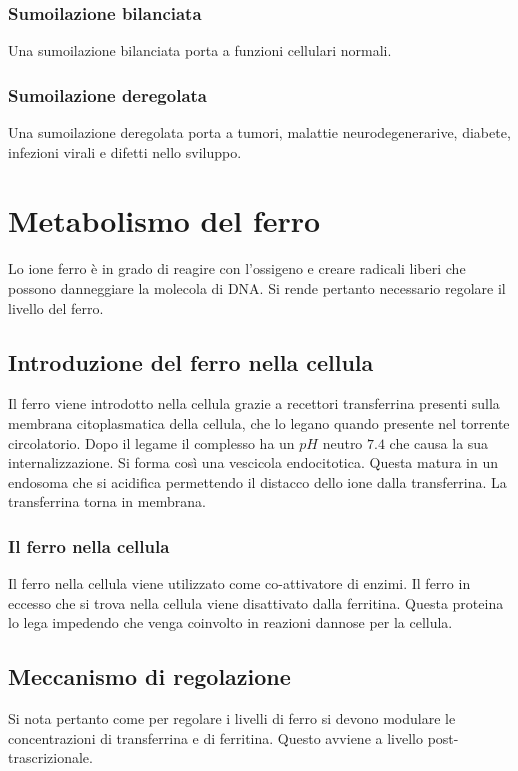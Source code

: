 		\subsubsection{Sumoilazione bilanciata}
		Una sumoilazione bilanciata porta a funzioni cellulari normali.

		\subsubsection{Sumoilazione deregolata}
		Una sumoilazione deregolata porta a tumori, malattie neurodegenerarive, diabete, infezioni virali e difetti nello sviluppo.
\section{Metabolismo del ferro}
Lo ione ferro \`e in grado di reagire con l'ossigeno e creare radicali liberi che possono danneggiare la molecola di DNA.
Si rende pertanto necessario regolare il livello del ferro.

	\subsection{Introduzione del ferro nella cellula}
	Il ferro viene introdotto nella cellula grazie a recettori transferrina presenti sulla membrana citoplasmatica della cellula, che lo legano quando presente nel torrente circolatorio.
	Dopo il legame il complesso ha un $pH$ neutro $7.4
$ che causa la sua internalizzazione.
	Si forma cos\`i una vescicola endocitotica.
	Questa matura in un endosoma che si acidifica permettendo il distacco dello ione dalla transferrina.
	La transferrina torna in membrana.

	\subsubsection{Il ferro nella cellula}
	Il ferro nella cellula viene utilizzato come co-attivatore di enzimi.
	Il ferro in eccesso che si trova nella cellula viene disattivato dalla ferritina.
	Questa proteina lo lega impedendo che venga coinvolto in reazioni dannose per la cellula.


	\subsection{Meccanismo di regolazione}
	Si nota pertanto come per regolare i livelli di ferro si devono modulare le concentrazioni di transferrina e di ferritina.
	Questo avviene a livello post-trascrizionale.

